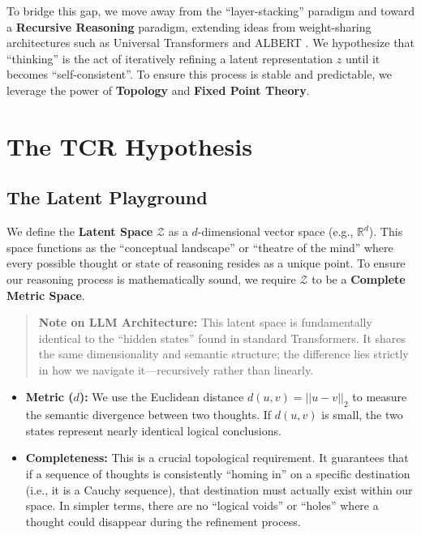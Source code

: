 \documentclass[11pt, a4paper]{article}
\begin{document}
To bridge this gap, we move away from the ``layer-stacking'' paradigm and toward a \textbf{Recursive Reasoning} paradigm, extending ideas from weight-sharing architectures such as Universal Transformers \cite{dehghani2019universal} and ALBERT \cite{lan2020albert}. We hypothesize that ``thinking'' is the act of iteratively refining a latent representation $z$ until it becomes ``self-consistent''. To ensure this process is stable and predictable, we leverage the power of \textbf{Topology} and \textbf{Fixed Point Theory}.

\section{The TCR Hypothesis}

\subsection{The Latent Playground}
We define the \textbf{Latent Space} $\mathcal{Z}$ as a $d$-dimensional vector space (e.g., $\mathbb{R}^d$). This space functions as the ``conceptual landscape'' or ``theatre of the mind'' where every possible thought or state of reasoning resides as a unique point. To ensure our reasoning process is mathematically sound, we require $\mathcal{Z}$ to be a \textbf{Complete Metric Space}.

\begin{quote}
\textbf{Note on LLM Architecture:} This latent space is fundamentally identical to the ``hidden states'' found in standard Transformers. It shares the same dimensionality and semantic structure; the difference lies strictly in how we navigate it---recursively rather than linearly.
\end{quote}

\begin{itemize}
    \item \textbf{Metric ($d$):} We use the Euclidean distance $d(u,v) = ||u-v||_2$ to measure the semantic divergence between two thoughts. If $d(u,v)$ is small, the two states represent nearly identical logical conclusions.
    \item \textbf{Completeness:} This is a crucial topological requirement. It guarantees that if a sequence of thoughts is consistently ``homing in'' on a specific destination (i.e., it is a Cauchy sequence), that destination must actually exist within our space. In simpler terms, there are no ``logical voids'' or ``holes'' where a thought could disappear during the refinement process.
\end{itemize}
\end{document}
